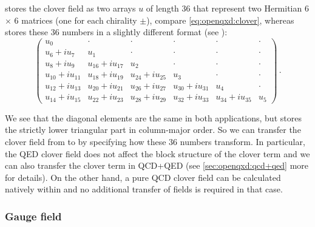 \Openqxd stores the clover field as two arrays $u$ of length $36$ that represent two Hermitian 6$\times$ 6 matrices (one for each chirality $\pm$), compare \cref{eq:openqxd:clover}, whereas \quda stores these 36 numbers in a slightly different format (see  \cite{QUDApaper}):
\begin{equation}
\begin{pmatrix}
u_0              & \cdot            & \cdot            & \cdot            & \cdot            & \cdot \\
u_6 + iu_7       & u_1              & \cdot            & \cdot            & \cdot            & \cdot \\
u_8 + iu_9       & u_{16} + iu_{17} & u_2              & \cdot            & \cdot            & \cdot \\
u_{10} + iu_{11} & u_{18} + iu_{19} & u_{24} + iu_{25} & u_3              & \cdot            & \cdot \\
u_{12} + iu_{13} & u_{20} + iu_{21} & u_{26} + iu_{27} & u_{30} + iu_{31} & u_4              & \cdot \\
u_{14} + iu_{15} & u_{22} + iu_{23} & u_{28} + iu_{29} & u_{32} + iu_{33} & u_{34} + iu_{35} & u_5
\end{pmatrix}\,.
\end{equation}

We see that the diagonal elements are the same in both applications, but \quda stores the strictly lower triangular part in column-major order.
So we can transfer the clover field from \openqxd to \quda by specifying how these 36 numbers transform. In particular, the QED
clover field does not affect the block structure of the clover term and we can also transfer the clover term in QCD+QED (see \cref{sec:openqxd:qcd+qed} more for details).
On the other hand, a pure QCD clover field can be calculated natively within \quda and no additional transfer of fields is required in that case.

\subsubsection{Gauge field}

